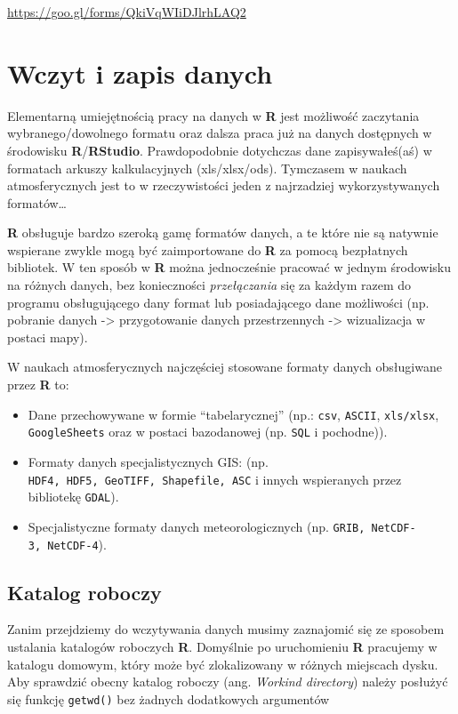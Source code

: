 \documentclass[]{book}
\providecommand{\tightlist}{%
  \setlength{\itemsep}{0pt}\setlength{\parskip}{0pt}}
\theoremstyle{definition}
\theoremstyle{definition}
\theoremstyle{definition}
\theoremstyle{remark}
\begin{document}
\url{https://goo.gl/forms/QkiVqWIiDJlrhLAQ2}

\chapter{Wczyt i zapis danych}\label{wczyt-i-zapis-danych}

Elementarną umiejętnością pracy na danych w \textbf{R} jest możliwość
zaczytania wybranego/dowolnego formatu oraz dalsza praca już na danych
dostępnych w środowisku \textbf{R}/\textbf{RStudio}. Prawdopodobnie
dotychczas dane zapisywałeś(aś) w formatach arkuszy kalkulacyjnych
(xls/xlsx/ods). Tymczasem w naukach atmosferycznych jest to w
rzeczywistości jeden z najrzadziej wykorzystywanych formatów\ldots{}

\textbf{R} obsługuje bardzo szeroką gamę formatów danych, a te które nie
są natywnie wspierane zwykle mogą być zaimportowane do \textbf{R} za
pomocą bezpłatnych bibliotek. W ten sposób w \textbf{R} można
jednocześnie pracować w jednym środowisku na różnych danych, bez
konieczności \emph{przełączania} się za każdym razem do programu
obsługującego dany format lub posiadającego dane możliwości (np.
pobranie danych -\textgreater{} przygotowanie danych przestrzennych
-\textgreater{} wizualizacja w postaci mapy).

W naukach atmosferycznych najczęściej stosowane formaty danych
obsługiwane przez \textbf{R} to:

\begin{itemize}
\tightlist
\item
  Dane przechowywane w formie ``tabelarycznej'' (np.: \texttt{csv},
  \texttt{ASCII}, \texttt{xls/xlsx}, \texttt{GoogleSheets} oraz w
  postaci bazodanowej (np. \texttt{SQL} i pochodne)).
\item
  Formaty danych specjalistycznych GIS: (np.
  \texttt{HDF4,\ HDF5,\ GeoTIFF,\ Shapefile,\ ASC} i innych wspieranych
  przez bibliotekę \texttt{GDAL}).
\item
  Specjalistyczne formaty danych meteorologicznych (np.
  \texttt{GRIB,\ NetCDF-3,\ NetCDF-4}).
\end{itemize}

\section{Katalog roboczy}\label{katalog-roboczy}

Zanim przejdziemy do wczytywania danych musimy zaznajomić się ze
sposobem ustalania katalogów roboczych \textbf{R}. Domyślnie po
uruchomieniu \textbf{R} pracujemy w katalogu domowym, który może być
zlokalizowany w różnych miejscach dysku. Aby sprawdzić obecny katalog
roboczy (ang. \emph{Workind directory}) należy posłużyć się funkcję
\texttt{getwd()} bez żadnych dodatkowych argumentów
\end{document}
